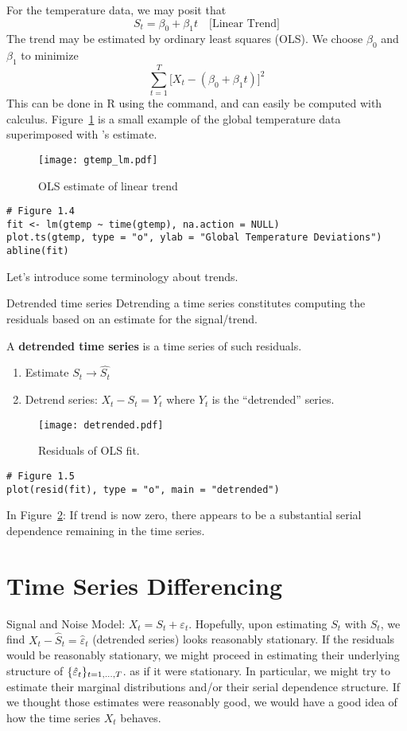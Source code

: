 For the temperature data, we may posit that
\[ S_t=\beta_0+\beta_1 t\quad\text{[Linear Trend]} \]
The trend may be estimated by ordinary least squares (OLS).
We choose $ \beta_0 $ and $ \beta_1 $ to minimize
\[ \sum_{t=1}^{T} \bigl[X_t-(\beta_0+\beta_1 t)\bigr]^2 \]
This can be done in R using the  command, and
can easily be computed with calculus. Figure~\ref{fig:gtemp_lm}
is a small example of the global temperature data superimposed
with 's estimate.
\begin{figure}[!ht]
    \centering
    \texttt{[image: gtemp\_lm.pdf]}
    \caption{OLS estimate of linear trend}\label{fig:gtemp_lm}
\end{figure}
\begin{verbatim}
# Figure 1.4
fit <- lm(gtemp ~ time(gtemp), na.action = NULL)
plot.ts(gtemp, type = "o", ylab = "Global Temperature Deviations")
abline(fit)
\end{verbatim}
Let's introduce some terminology about trends.
\begin{Definition}{Detrended time series}{}
    Detrending a time series constitutes computing the
    residuals based on an estimate for the signal/trend.

    A \textbf{detrended time series} is a time series of such residuals.
    \begin{enumerate}
        \item Estimate $ S_t\to \hat{S_t} $
        \item Detrend series: $ X_t-\hat{S_t}=Y_t $
              where $ Y_t $ is the ``detrended'' series.
    \end{enumerate}
\end{Definition}
\begin{figure}[!ht]
    \centering
    \texttt{[image: detrended.pdf]}
    \caption{Residuals of OLS fit.}\label{fig:detrended}
\end{figure}
\begin{verbatim}
# Figure 1.5
plot(resid(fit), type = "o", main = "detrended")
\end{verbatim}
In Figure~\ref{fig:detrended}:
If trend is now zero, there appears to be a substantial serial
dependence remaining in the time series.

\section{Time Series Differencing}
Signal and Noise Model: $ X_t=S_t+\varepsilon_t $. Hopefully,
upon estimating $ S_t $ with $ \hat{S}_t $,
we find $ X_t-\hat{S}_t=\hat{\varepsilon}_t $ (detrended series)
looks reasonably stationary. If the residuals would be
reasonably stationary, we might
proceed in estimating their underlying structure of $ \{\hat{\varepsilon}_t\}_{t=1,\ldots,T} $.
as if it were stationary. {\color{blue}In particular, we might try to estimate their marginal
        distributions and/or their serial dependence structure. If we thought those estimates
        were reasonably good, we would have a good idea of how the time series $ X_t $ behaves.}

